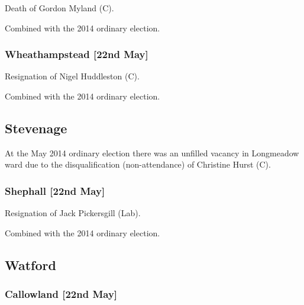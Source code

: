 \begin{resultsiii}

Death of Gordon Myland (C).

Combined with the 2014 ordinary election.

\subsubsection*{Wheathampstead \hspace*{\fill}\nolinebreak[1]%
\enspace\hspace*{\fill}
[22nd May]}


Resignation of Nigel Huddleston (C).

Combined with the 2014 ordinary election.

\subsection*{Stevenage}

At the May 2014 ordinary election there was an unfilled vacancy in Longmeadow ward due to the disqualification (non-attendance) of Christine Hurst (C).

\subsubsection*{Shephall \hspace*{\fill}\nolinebreak[1]%
\enspace\hspace*{\fill}
[22nd May]}


Resignation of Jack Pickersgill (Lab).

Combined with the 2014 ordinary election.

\subsection*{Watford}

\subsubsection*{Callowland \hspace*{\fill}\nolinebreak[1]%
\enspace\hspace*{\fill}
[22nd May]}


\end{resultsiii}
